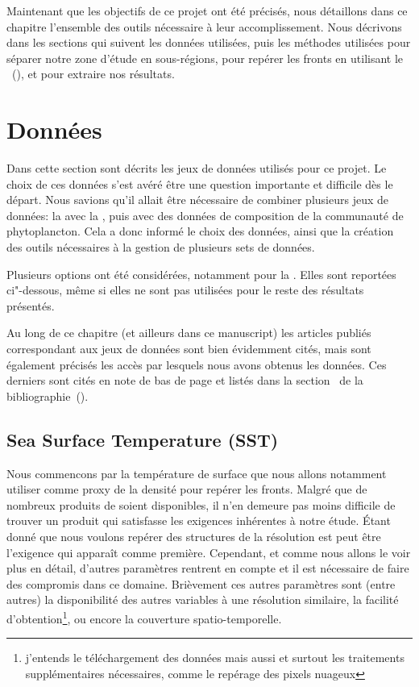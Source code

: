 
\label{chp:methodes}
\graphicspath{{resources/méthodes}}

\minitoc%
\clearpage

Maintenant que les objectifs de ce projet ont été précisés, nous détaillons dans ce chapitre l'ensemble des outils nécessaire à leur accomplissement.
Nous décrivons dans les sections qui suivent les données utilisées, puis les méthodes utilisées pour séparer notre zone d'étude en sous-régions, pour repérer les fronts en utilisant le ~(), et pour extraire nos résultats.

\section{Données}
\label{sec:donnees}

Dans cette section sont décrits les jeux de données utilisés pour ce projet.
Le choix de ces données s'est avéré être une question importante et difficile dès le départ.
Nous savions qu'il allait être nécessaire de combiner plusieurs jeux de données: la  avec la , puis avec des données de composition de la communauté de phytoplancton.
Cela a donc informé le choix des données, ainsi que la création des outils nécessaires à la gestion de plusieurs sets de données.

Plusieurs options ont été considérées, notamment pour la .
Elles sont reportées ci"-dessous, même si elles ne sont pas utilisées pour le reste des résultats présentés.

Au long de ce chapitre (et ailleurs dans ce manuscript) les articles publiés correspondant aux jeux de données sont bien évidemment cités, mais sont également précisés les accès par lesquels nous avons obtenus les données.
Ces derniers sont cités en note de bas de page et listés dans la section~ de la bibliographie~().

\subsection{Sea Surface Temperature (SST)}
\label{sec:donnees-sst}

Nous commencons par la température de surface que nous allons notamment utiliser comme proxy de la densité pour repérer les fronts.
Malgré que de nombreux produits de  soient disponibles, il n'en demeure pas moins difficile de trouver un produit qui satisfasse les exigences inhérentes à notre étude.
Étant donné que nous voulons repérer des structures de  la résolution est peut être l’exigence qui apparaît comme première.
Cependant, et comme nous allons le voir plus en détail, d'autres paramètres rentrent en compte et il est nécessaire de faire des compromis dans ce domaine.
Brièvement ces autres paramètres sont (entre autres) la disponibilité des autres variables à une résolution similaire, la facilité d'obtention\footnote{%
  j'entends le téléchargement des données mais aussi et surtout les traitements supplémentaires nécessaires, comme le repérage des pixels nuageux },
ou encore la couverture spatio-temporelle.

